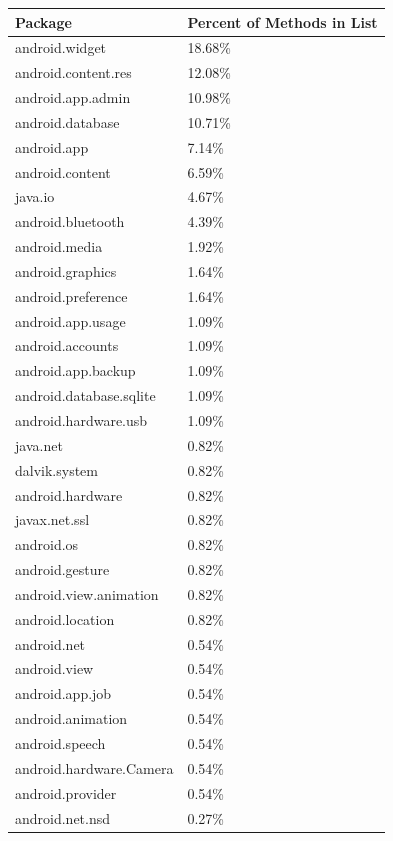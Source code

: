\documentclass{sig-alternate}
\begin{document}
\begin{table}
\centering

\label{tab:input_method_percent}

\begin{tabular}{|l|l|}
\hline
\textbf{Package} & \textbf{Percent of Methods in List} \\ 
\hline

android.widget & 18.68\% \\ 
android.content.res & 12.08\% \\ 
android.app.admin & 10.98\% \\ 
android.database & 10.71\% \\ 
android.app & 7.14\% \\ 
android.content & 6.59\% \\ 
java.io & 4.67\% \\ 
android.bluetooth & 4.39\% \\ 
android.media & 1.92\% \\ 
android.graphics & 1.64\% \\ 
android.preference & 1.64\% \\ 
android.app.usage & 1.09\% \\ 
android.accounts & 1.09\% \\ 
android.app.backup & 1.09\% \\ 
android.database.sqlite & 1.09\% \\ 
android.hardware.usb & 1.09\% \\ 
java.net & 0.82\% \\ 
dalvik.system & 0.82\% \\ 
android.hardware & 0.82\% \\ 
javax.net.ssl & 0.82\% \\ 
android.os & 0.82\% \\ 
android.gesture & 0.82\% \\ 
android.view.animation & 0.82\% \\ 
android.location & 0.82\% \\ 
android.net & 0.54\% \\ 
android.view & 0.54\% \\ 
android.app.job & 0.54\% \\ 
android.animation & 0.54\% \\ 
android.speech & 0.54\% \\ 
android.hardware.Camera & 0.54\% \\ 
android.provider & 0.54\% \\ 
android.net.nsd & 0.27\% \\ 

\end{tabular}
\end{table}
\end{document}
